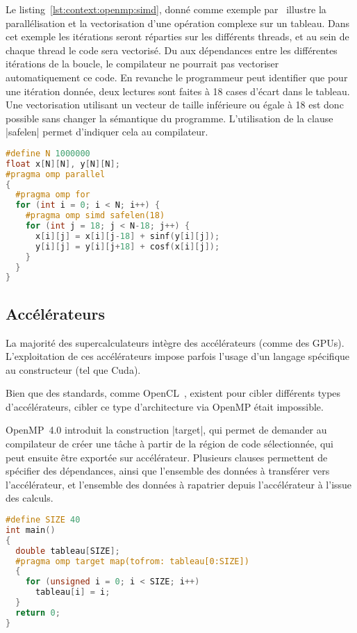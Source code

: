 Le listing~\ref{lst:context:openmp:simd}, donné comme exemple par~\cite{HPCToday} illustre la parallélisation et la vectorisation d'une opération complexe sur un tableau.
Dans cet exemple les itérations seront réparties sur les différents threads, et au sein de chaque thread le code sera vectorisé.
Du aux dépendances entre les différentes itérations de la boucle, le compilateur ne pourrait pas vectoriser automatiquement ce code.
En revanche le programmeur peut identifier que pour une itération donnée, deux lectures sont faites à 18 cases d'écart dans le tableau. Une vectorisation utilisant un vecteur de taille inférieure ou égale à 18 est donc possible sans changer la sémantique du programme.
L'utilisation de la clause |safelen| permet d'indiquer cela au compilateur.


\begin{lstlisting}[language=c++,caption=Vectorisation d'une opération complexe sur des tableaux,label=lst:context:openmp:simd]
#define N 1000000
float x[N][N], y[N][N];
#pragma omp parallel
{
  #pragma omp for
  for (int i = 0; i < N; i++) {
    #pragma omp simd safelen(18)
    for (int j = 18; j < N-18; j++) {
      x[i][j] = x[i][j-18] + sinf(y[i][j]);
      y[i][j] = y[i][j+18] + cosf(x[i][j]);
    }
  }
}
\end{lstlisting}



\subsection{Accélérateurs}

La majorité des supercalculateurs intègre des accélérateurs (comme des GPUs).
L'exploitation de ces accélérateurs impose parfois l'usage d'un langage spécifique au constructeur (tel que Cuda).

Bien que des standards, comme OpenCL~\cite{Stone2010}, existent pour cibler différents types d'accélérateurs, cibler ce type d'architecture via OpenMP était impossible.

OpenMP~4.0 introduit la construction |target|, qui permet de demander au compilateur de créer une tâche à partir de la région de code sélectionnée, qui peut ensuite être exportée sur accélérateur.
Plusieurs clauses permettent de spécifier des dépendances, ainsi que l'ensemble des données à transférer vers l'accélérateur, et l'ensemble des données à rapatrier depuis l'accélérateur à l'issue des calculs.

\begin{lstlisting}[language=c++,caption=Addition sur un accélérateur,label=lst:context:openmp:target]
#define SIZE 40
int main()
{
  double tableau[SIZE];
  #pragma omp target map(tofrom: tableau[0:SIZE])
  {
    for (unsigned i = 0; i < SIZE; i++)
      tableau[i] = i;
  }
  return 0;
}
\end{lstlisting}


